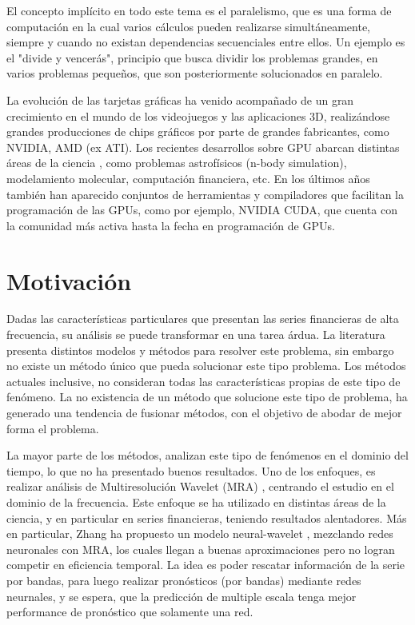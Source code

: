 El concepto implícito en todo este tema es el paralelismo, que es una forma de
computación en la cual varios cálculos pueden realizarse simultáneamente,
siempre y cuando no existan dependencias secuenciales entre ellos. Un ejemplo
es el "divide y vencerás", principio que busca dividir los problemas grandes,
en varios problemas pequeños, que son posteriormente solucionados en paralelo.

La evolución de las tarjetas gráficas ha venido acompañado de un gran
crecimiento en el mundo de los videojuegos y las aplicaciones 3D, realizándose
grandes producciones de chips gráficos por parte de grandes fabricantes, como
NVIDIA, AMD (ex ATI). Los recientes desarrollos sobre GPU abarcan distintas
áreas de la ciencia \cite{kirk2010programming}, como problemas astrofísicos
(n-body simulation), modelamiento molecular, computación financiera, etc. En
los últimos años también han aparecido conjuntos de herramientas y compiladores
que facilitan la programación de las GPUs, como por ejemplo, NVIDIA CUDA, que
cuenta con la comunidad más activa hasta la fecha en programación de GPUs.

\section{Motivación}

Dadas las características particulares que presentan las series financieras de
alta frecuencia, su análisis se puede transformar en una tarea árdua. La
literatura presenta distintos modelos y métodos para resolver este problema,
sin embargo no existe un método único que pueda solucionar este tipo problema.
Los métodos actuales inclusive, no consideran todas las características propias
de este tipo de fenómeno. La no existencia de un método que solucione este tipo
de problema, ha generado una tendencia de fusionar métodos, con el objetivo de
abodar de mejor forma el problema.

La mayor parte de los métodos, analizan este tipo de fenómenos en el dominio
del tiempo, lo que no ha presentado buenos resultados.  Uno de los enfoques, es
realizar análisis de Multiresolución Wavelet (MRA) \cite{benaouda2006wavelet},
centrando el estudio en el dominio de la frecuencia.  Este enfoque se ha
utilizado en distintas áreas de la ciencia, y en particular en series
financieras, teniendo resultados alentadores. Más en particular, Zhang ha
propuesto un modelo neural-wavelet \cite{zhang2001adaptive}, mezclando redes
neuronales con MRA, los cuales llegan a buenas aproximaciones pero no logran
competir en eficiencia temporal. La idea es poder rescatar información de la
serie por bandas, para luego realizar pronósticos (por bandas) mediante redes
neurnales, y se espera, que la predicción de multiple escala tenga mejor
performance de pronóstico que solamente una red. 

